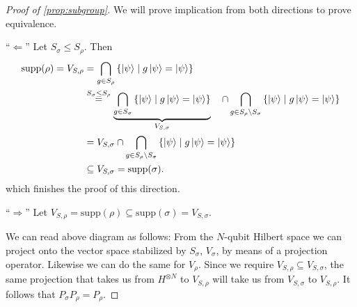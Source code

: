 \begin{proof}[Proof of \cref{prop:subgroup}]
  We will prove implication from both directions to prove equivalence.

  \enquote{$\Leftarrow$} Let $S_\sigma \leq S_\rho$. Then
  \begin{align*}
    \mathrm{supp}(\rho) = V_{S,\rho} &= \bigcap_{g\in S_\rho} \left\{ \ket{\psi} \mid
    g\ket{\psi} = \ket{\psi} \right\} \\
        &\overset{S_\sigma \leq S_\rho}{=} \underbrace{\bigcap_{g\in S_\sigma}
        \left\{\ket{\psi} \mid g \ket{\psi} =
        \ket{\psi}\right\}}_{V_{S,\sigma}}\ \ \ \cap \bigcap_{g \in S_\rho \setminus
        S_\sigma} \left\{\ket{\psi} \mid g \ket{\psi} =
        \ket{\psi}\right\}\\
        &= V_{S,\sigma} \cap \bigcap_{g \in S_\rho \setminus
        S_\sigma} \left\{\ket{\psi} \mid g \ket{\psi} =
        \ket{\psi}\right\}\\
        &\subseteq V_{S,\sigma} = \mathrm{supp}(\sigma)
  .\end{align*}
  which finishes the proof of this direction.

  \enquote{$\Rightarrow$} Let $V_{S,\rho} = \mathrm{supp}(\rho) \subseteq
  \mathrm{supp}(\sigma) = V_{S,\sigma}$. 

  \begin{figure}[htpb]
    \centering
\end{figure}

  We can read above diagram as follows: From the $N$-qubit Hilbert space we can
  project onto the vector space stabilized by $S_\sigma$, $V_\sigma$, by means of a
  projection operator. Likewise we can do the same for $V_\rho$. Since we
  require $V_{S,\rho} \subseteq V_{S,\sigma}$, the same projection that takes
  us from $H^{\otimes N}$ to $V_{S,\rho}$ will take us from $V_{S,\sigma}$ to
  $V_{S,\rho}$. It follows that $P_\sigma P_\rho = P_\rho$.


\end{proof}
